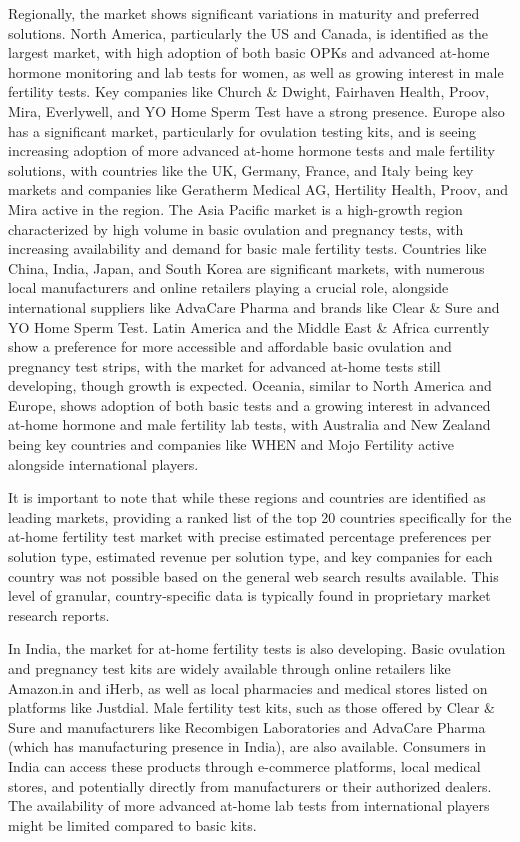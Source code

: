 \documentclass{article}
\begin{document}
Regionally, the market shows significant variations in maturity and preferred solutions. North America, particularly the US and Canada, is identified as the largest market, with high adoption of both basic OPKs and advanced at-home hormone monitoring and lab tests for women, as well as growing interest in male fertility tests. Key companies like Church \& Dwight, Fairhaven Health, Proov, Mira, Everlywell, and YO Home Sperm Test have a strong presence. Europe also has a significant market, particularly for ovulation testing kits, and is seeing increasing adoption of more advanced at-home hormone tests and male fertility solutions, with countries like the UK, Germany, France, and Italy being key markets and companies like Geratherm Medical AG, Hertility Health, Proov, and Mira active in the region. The Asia Pacific market is a high-growth region characterized by high volume in basic ovulation and pregnancy tests, with increasing availability and demand for basic male fertility tests. Countries like China, India, Japan, and South Korea are significant markets, with numerous local manufacturers and online retailers playing a crucial role, alongside international suppliers like AdvaCare Pharma and brands like Clear \& Sure and YO Home Sperm Test. Latin America and the Middle East \& Africa currently show a preference for more accessible and affordable basic ovulation and pregnancy test strips, with the market for advanced at-home tests still developing, though growth is expected. Oceania, similar to North America and Europe, shows adoption of both basic tests and a growing interest in advanced at-home hormone and male fertility lab tests, with Australia and New Zealand being key countries and companies like WHEN and Mojo Fertility active alongside international players.

It is important to note that while these regions and countries are identified as leading markets, providing a ranked list of the top 20 countries specifically for the at-home fertility test market with precise estimated percentage preferences per solution type, estimated revenue per solution type, and key companies for each country was not possible based on the general web search results available. This level of granular, country-specific data is typically found in proprietary market research reports.

In India, the market for at-home fertility tests is also developing. Basic ovulation and pregnancy test kits are widely available through online retailers like Amazon.in and iHerb, as well as local pharmacies and medical stores listed on platforms like Justdial. Male fertility test kits, such as those offered by Clear \& Sure and manufacturers like Recombigen Laboratories and AdvaCare Pharma (which has manufacturing presence in India), are also available. Consumers in India can access these products through e-commerce platforms, local medical stores, and potentially directly from manufacturers or their authorized dealers. The availability of more advanced at-home lab tests from international players might be limited compared to basic kits.
\end{document}
